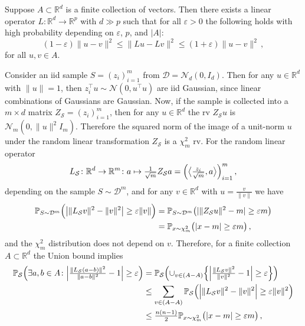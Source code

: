 \documentclass[a4paper,10pt]{article}
\newcommand{\real}{\mathbb{R}}
\begin{document}
Suppose $A \subset \real^d$ is a finite collection of vectors. Then there exists
a linear operator $L\colon\real^d\to \real^p$ with $d \gg p$ such that for all $\varepsilon > 0$
the following holds with high probability depending on $\varepsilon$, $p$, and
$\lvert A \rvert$:
$$
  (1 - \varepsilon) \|u - v\|^2
    \leq \bigl\| L u - L v \bigr\|^2
    \leq (1 + \varepsilon) \|u - v\|^2
    \,, $$
for all $u, v \in A$.

\medskip
Consider an iid sample $S = (z_i)_{i=1}^m$ from $\mathcal{D} = \mathcal{N}_d(0, I_d)$.
Then for any $u \in \real^d$ with $\|u\| = 1$, then $z_i^\top u \sim \mathcal{N}(0, u^\top u)$
are iid Gaussian, since linear combinations of Gaussians are Gaussian. Now, if the
sample is collected into a $m\times d$ matrix $Z_\mathcal{S} = (z_i)_{i=1}^m$, then
for any $u \in \real^d$ the rv $Z_\mathcal{S} u$ is $\mathcal{N}_m(0, \|u\|^2 I_m)$.
Therefore the squared norm of the image of a unit-norm $u$ under the random linear
transformation $Z_\mathcal{S}$ is a $\chi^2_m$ rv. For the random linear operator
\begin{equation} \label{eq:random_operator}
  L_\mathcal{S} \colon \real^d \to \real^m
    \colon a \mapsto \tfrac1{\sqrt{m}} Z_\mathcal{S} a
      = \Bigl(
        \bigl\langle \tfrac{z_i}{\sqrt{m}}, a \bigr\rangle
      \Bigr)_{i=1}^m
    \,,
\end{equation}
depending on the sample $S \sim \mathcal{D}^m$, and for any $v \in \real^d$ with
$u = \tfrac{v}{\|v\|}$ we have
\begin{align*}
  \mathbb{P}_{S \sim \mathcal{D}^m} \Bigl(
    \bigl\lvert \| L_\mathcal{S} v \|^2 - \|v\|^2 \bigr \rvert
      \geq \varepsilon \|v\|
  \Bigr)
    &= \mathbb{P}_{S \sim \mathcal{D}^m} \bigl(
        \lvert \|Z_\mathcal{S} u\|^2 - m \rvert \geq \varepsilon m
      \bigr)
    \\
    &= \mathbb{P}_{x \sim \chi^2_m} \bigl(
        \lvert x - m \rvert \geq \varepsilon m
      \bigr)
    \,,
\end{align*}
and the $\chi^2_m$ distribution does not depend on $v$. Therefore, for a finite
collection $A \subset \real^d$ the Union bound implies
\begin{align*}
  \mathbb{P}_\mathcal{S}\Bigl(
    \exists{a, b\in A} \colon
    \Bigl\lvert \tfrac{\| L_\mathcal{S} (a - b) \|^2}{\|a - b\|^2} - 1 \Bigr\rvert
      \geq \varepsilon
  \Bigr)
    &= \mathbb{P}_\mathcal{S}\Bigl(
      \cup_{v\in (A - A)} \Bigl\{
        \Bigl\lvert \tfrac{\| L_\mathcal{S} v \|^2}{\|v\|^2} - 1 \Bigr\rvert
          \geq \varepsilon
      \Bigr\}
    \Bigr)
    \\
    &\leq \sum_{v\in (A - A)}
      \mathbb{P}_\mathcal{S}\Bigl(
        \Bigl\lvert \| L_\mathcal{S} v \|^2 -  \|v\|^2 \Bigr\rvert
          \geq \varepsilon\|v\|^2
      \Bigr)
    \\
    &\leq \tfrac{n (n - 1)}2 \mathbb{P}_{x \sim \chi^2_m} \bigl(
        \lvert x - m \rvert \geq \varepsilon m
      \bigr)
    \,,
\end{align*}
\end{document}
